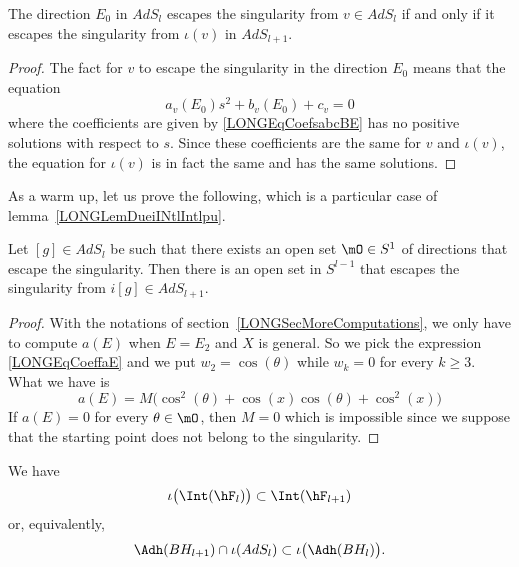 \begin{lemma}
    The direction $E_0$ in $AdS_l$ escapes the singularity from $v\in AdS_l$ if and only if it escapes the singularity from $\iota(v)$ in $AdS_{l+1}$.
\end{lemma}

\begin{proof}
    The fact for $v$ to escape the singularity in the direction $E_0$ means that the equation
    \begin{equation}
        a_{v}(E_0)s^2+b_{v}(E_0)+c_{v}=0
    \end{equation}
    where the coefficients are given by \eqref{LONGEqCoefsabcBE} has no positive solutions with respect to $s$. Since these coefficients are the same for $v$ and $\iota(v)$, the equation for $\iota(v)$ is in fact the same and has the same solutions.
\end{proof}

%
As a warm up, let us prove the following, which is a particular case of lemma~\ref{LONGLemDueiINtlIntlpu}.
\begin{lemma}
    Let $[g]\in AdS_l$ be such that there exists an open set $\mO\in S^1$ of directions that escape the singularity. Then there is an open set in $S^{l-1}$ that escapes the singularity from $i[g]\in AdS_{l+1}$.
\end{lemma}

\begin{proof}
    With the notations of section~\ref{LONGSecMoreComputations}, we only have to compute $a(E)$ when $E=E_2$ and $X$ is general. So we pick the expression \eqref{LONGEqCoeffaE} and we put $w_2=\cos(\theta)$ while $w_k=0$ for every $k\geq 3$. What we have is
    \begin{equation}
        a(E)=M\Big( \cos^2(\theta)+\cos(x)\cos(\theta)+\cos^2(x) \Big)
    \end{equation}
    If $a(E)=0$ for every $\theta\in\mO$, then $M=0$ which is impossible since we suppose that the starting point does not belong to the singularity.
\end{proof}

\begin{lemma}        \label{LONGLemDueiINtlIntlpu}
    We have
    \begin{equation}
        \iota\big( \Int(\hF_l) \big)\subset\Int(\hF_{l+1})
    \end{equation}
    or, equivalently,
    \begin{equation}
        \Adh(BH_{l+1})\cap\iota(AdS_l)\subset\iota\big( \Adh(BH_l) \big).
    \end{equation}
\end{lemma}

